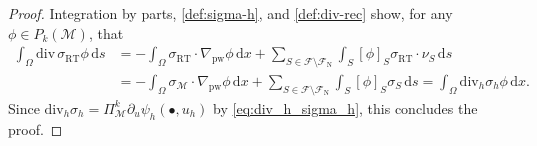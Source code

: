 \documentclass[a4paper]{amsart}
\numberwithin{equation}{section}
\renewcommand{\d}[1]{\,\mathrm{d}#1}
\renewcommand{\div}{\mathrm{div}}
\newcommand{\Mcal}{\mathcal{M}}
\newcommand{\RT}{\mathrm{RT}}
\newcommand{\pw}{\mathrm{pw}}
\theoremstyle{remark}
\newtheorem{remark}[theorem]{Remark}
\begin{document}
\begin{proof}
Integration by parts, \eqref{def:sigma-h}, and \eqref{def:div-rec} show, for any $\phi \in P_k(\Mcal)$, that
	\begin{align*}
		\int_\Omega \div\,\sigma_\RT \phi \d{s} &= -\int_\Omega \sigma_\RT \cdot \nabla_\pw \phi \d{x} + \sum_{S \in \mathcal{F}\setminus\mathcal{F}_\mathrm{N}} \int_S [\phi]_S \sigma_\RT\cdot \nu_S \d{s}\\
		&= -\int_\Omega \sigma_\Mcal \cdot \nabla_\pw \phi \d{x} + \sum_{S \in \mathcal{F}\setminus\mathcal{F}_\mathrm{N}} \int_S [\phi]_S \sigma_S \d{s} = \int_\Omega \div_h \sigma_h \phi \d{x}.
	\end{align*}
	Since $\div_h \sigma_h = \Pi_\Mcal^{k} \partial_u \psi_h(\bullet,u_h)$ by \eqref{eq:div_h_sigma_h}, this concludes the proof.
\end{proof}
\end{document}
